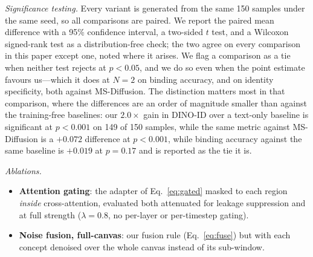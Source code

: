 \documentclass[10pt,twocolumn,letterpaper]{article}
\begin{document}
\noindent\textit{Significance testing.}
\label{sec:significance}
Every variant is generated from the same 150 samples under the same seed, so
all comparisons are paired.  We report the paired mean difference with a
95\% confidence interval, a two-sided $t$ test, and a Wilcoxon signed-rank
test as a distribution-free check; the two agree on every comparison in this
paper except one, noted where it arises.  We flag a comparison as a tie when
neither test rejects at $p{<}0.05$, and we do so even when the point estimate
favours us---which it does at $N{=}2$ on binding accuracy, and on identity
specificity, both against MS-Diffusion.  The distinction matters most in that
comparison, where the differences are an order of magnitude smaller than
against the training-free baselines: our $2.0\times$ gain in DINO-ID over a
text-only baseline is significant at $p{<}0.001$ on 149 of 150 samples, while
the same metric against MS-Diffusion is a $+0.072$ difference at
$p{<}0.001$, while binding accuracy against the same baseline is $+0.019$ at
$p{=}0.17$ and is reported as the tie it is.

\noindent\textit{Ablations.}
\begin{itemize}\setlength\itemsep{2pt}
\item \textbf{Attention gating}: the adapter of Eq.~\ref{eq:gated} masked to
      each region \emph{inside} cross-attention, evaluated both attenuated for
      leakage suppression and at full strength ($\lambda{=}0.8$, no per-layer
      or per-timestep gating).
\item \textbf{Noise fusion, full-canvas}: our fusion rule
      (Eq.~\ref{eq:fuse}) but with each concept denoised over the whole
      canvas instead of its sub-window.
\end{itemize}
\end{document}
